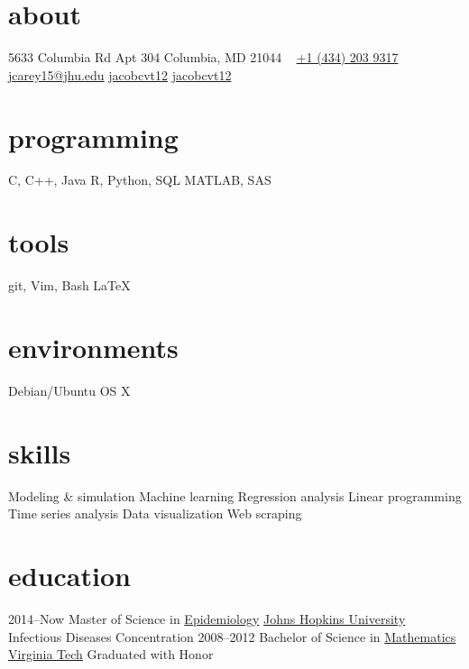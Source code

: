 \documentclass[]{friggeri-cv} %
\begin{document}



\begin{aside} %
\section{about}
5633 Columbia Rd
Apt 304
Columbia, MD 21044
~
\href{tel:14342039317}{\faPhone +1 (434) 203 9317}
\href{mailto:jcarey15@jhu.edu}{\faEnvelope  jcarey15@jhu.edu}
\href{https://github.com/jacobcvt12}{\faGithub jacobcvt12}
\href{https://www.linkedin.com/in/jacobcvt12}{\faLinkedin jacobcvt12}
\section{programming}
C, C++, Java
R, Python, SQL
MATLAB, SAS
\section{tools}
git, Vim, Bash
\LaTeX
\section{environments}
Debian/Ubuntu
OS X
\section{skills}
Modeling \& simulation
Machine learning
Regression analysis
Linear programming
Time series analysis
Data visualization
Web scraping
\end{aside}


\section{education}

\begin{entrylist}
\entry
{2014--Now}
{Master {\normalfont of Science in}
\href{http://www.jhsph.edu/departments/epidemiology/}{Epidemiology}}
{\href{http://www.jhu.edu}{Johns Hopkins University}}
{Infectious Diseases Concentration}
\entry
{2008--2012}
{Bachelor {\normalfont of Science in}
\href{https://www.math.vt.edu/}{Mathematics}}
{\href{http://www.vt.edu}{Virginia Tech}}
{Graduated with Honor}
\end{entrylist}
\end{document}
